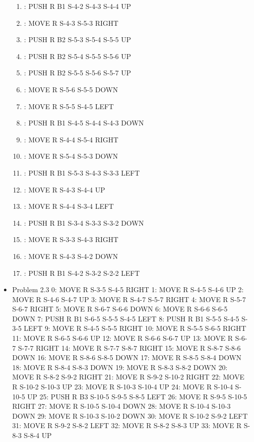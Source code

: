 \documentclass[12pt]{article}
\begin{document}
\begin{appendix}
\begin{itemize}
\begin{enumerate}
	\item: PUSH R B1 S-4-2 S-4-3 S-4-4 UP
	\item: MOVE R S-4-3 S-5-3 RIGHT
	\item: PUSH R B2 S-5-3 S-5-4 S-5-5 UP
	\item: PUSH R B2 S-5-4 S-5-5 S-5-6 UP
	\item: PUSH R B2 S-5-5 S-5-6 S-5-7 UP
	\item: MOVE R S-5-6 S-5-5 DOWN
	\item: MOVE R S-5-5 S-4-5 LEFT
	\item: PUSH R B1 S-4-5 S-4-4 S-4-3 DOWN
	\item: MOVE R S-4-4 S-5-4 RIGHT
	\item: MOVE R S-5-4 S-5-3 DOWN
	\item: PUSH R B1 S-5-3 S-4-3 S-3-3 LEFT
	\item: MOVE R S-4-3 S-4-4 UP
	\item: MOVE R S-4-4 S-3-4 LEFT
	\item: PUSH R B1 S-3-4 S-3-3 S-3-2 DOWN
	\item: MOVE R S-3-3 S-4-3 RIGHT
	\item: MOVE R S-4-3 S-4-2 DOWN
	\item: PUSH R B1 S-4-2 S-3-2 S-2-2 LEFT
      \end{enumerate}
  \item Problem 2.3
	0: MOVE R S-3-5 S-4-5 RIGHT
        1: MOVE R S-4-5 S-4-6 UP
        2: MOVE R S-4-6 S-4-7 UP
        3: MOVE R S-4-7 S-5-7 RIGHT
        4: MOVE R S-5-7 S-6-7 RIGHT
        5: MOVE R S-6-7 S-6-6 DOWN
        6: MOVE R S-6-6 S-6-5 DOWN
        7: PUSH R B1 S-6-5 S-5-5 S-4-5 LEFT
        8: PUSH R B1 S-5-5 S-4-5 S-3-5 LEFT
        9: MOVE R S-4-5 S-5-5 RIGHT
       10: MOVE R S-5-5 S-6-5 RIGHT
       11: MOVE R S-6-5 S-6-6 UP
       12: MOVE R S-6-6 S-6-7 UP
       13: MOVE R S-6-7 S-7-7 RIGHT
       14: MOVE R S-7-7 S-8-7 RIGHT
       15: MOVE R S-8-7 S-8-6 DOWN
       16: MOVE R S-8-6 S-8-5 DOWN
       17: MOVE R S-8-5 S-8-4 DOWN
       18: MOVE R S-8-4 S-8-3 DOWN
       19: MOVE R S-8-3 S-8-2 DOWN
       20: MOVE R S-8-2 S-9-2 RIGHT
       21: MOVE R S-9-2 S-10-2 RIGHT
       22: MOVE R S-10-2 S-10-3 UP
       23: MOVE R S-10-3 S-10-4 UP
       24: MOVE R S-10-4 S-10-5 UP
       25: PUSH R B3 S-10-5 S-9-5 S-8-5 LEFT
       26: MOVE R S-9-5 S-10-5 RIGHT
       27: MOVE R S-10-5 S-10-4 DOWN
       28: MOVE R S-10-4 S-10-3 DOWN
       29: MOVE R S-10-3 S-10-2 DOWN
       30: MOVE R S-10-2 S-9-2 LEFT
       31: MOVE R S-9-2 S-8-2 LEFT
       32: MOVE R S-8-2 S-8-3 UP
       33: MOVE R S-8-3 S-8-4 UP

\end{itemize}
\end{appendix}
\end{document}
